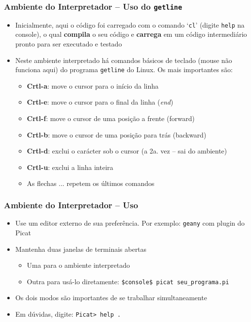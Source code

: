 \begin{frame}[fragile]
\frametitle{Ambiente do Interpretador -- Uso do \texttt{getline}}

\begin{itemize}
  \item Inicialmente, aqui o código foi carregado com o comando `\texttt{cl}' (digite \texttt{help} na console), o qual \textbf{compila} o seu código e \textbf{carrega} em um código intermediário pronto
  para ser executado e testado
  
  \pause
  \item Neste ambiente interpretado há comandos básicos de teclado (mouse não funciona aqui)
  do programa \texttt{getline} do Linux. Os mais importantes são:
  \pause
  \begin{itemize}
    \item  \textbf{Crtl-a}: move o cursor para o início da linha
        \item  \textbf{Crtl-e}: move o cursor para o final da linha (\textit{end})
        \item  \textbf{Crtl-f}: 	move o cursor de uma posição a frente (forward)
         \item  \textbf{Crtl-b}: 	move o cursor de uma posição para trás (backward)
         \item  \textbf{Crtl-d}: 	exclui o carácter sob  o cursor (a 2a. vez -- sai do ambiente)
        \item  \textbf{Crtl-u}: 	exclui a linha inteira
        \item As flechas ... repetem os últimos comandos
  \end{itemize}
  
\end{itemize}

\end{frame}



\begin{frame}[fragile]
\frametitle{Ambiente do Interpretador -- Uso}

\begin{itemize}
  \item Use um editor externo de sua preferência. Por exemplo:
   \texttt{geany} com plugin do Picat

    \pause
  \item Mantenha duas janelas de terminais abertas
    \begin{itemize}
    \item Uma para o ambiente interpretado
    \item Outra para usá-lo diretamente: \texttt{\$console\$ picat seu\_programa.pi}
  \end{itemize}
  
    \pause
  \item Os dois modos são importantes de se trabalhar simultaneamente
  
  \pause
  \item Em dúvidas, digite: \texttt{Picat> help .}
    
\end{itemize}

\end{frame}


